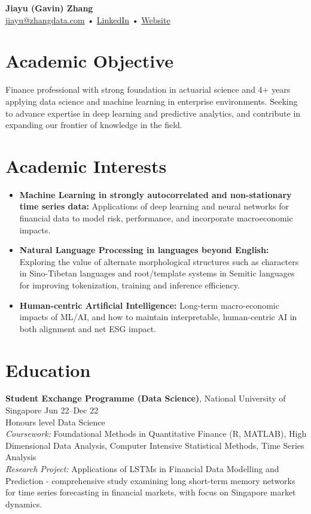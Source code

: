 \documentclass[10pt,letterpaper]{article}
\makeatletter
\newcommand{\name}{Jiayu (Gavin) Zhang}
\newcommand{\emailaddr}{jiayu@zhangdata.com}
\newcommand{\linkedin}{https://www.linkedin.com/in/jiayu-g-zhang}
\newcommand{\website}{https://www.zhangdata.com}
\makeatother
\begin{document}
\begin{center}
  {\LARGE\bfseries \name}\\[2pt]
  \href{mailto:\emailaddr}{\emailaddr} • \href{\linkedin}{LinkedIn} • \href{\website}{Website}
\end{center}

\section*{Academic Objective}
Finance professional with strong foundation in actuarial science and 4+ years applying data science and machine learning in enterprise environments. Seeking to advance expertise in deep learning and predictive analytics, and contribute in expanding our frontier of knowledge in the field.

\section*{Academic Interests}
\begin{itemize}
  \item \textbf{Machine Learning in strongly autocorrelated and non-stationary time series data:} Applications of deep learning and neural networks for financial data to model risk, performance, and incorporate macroeconomic impacts.
  \item \textbf{Natural Language Processing in languages beyond English:} Exploring the value of alternate morphological structures such as characters in Sino-Tibetan languages and root/template systems in Semitic languages for improving tokenization, training and inference efficiency.
  \item \textbf{Human-centric Artificial Intelligence:} Long-term macro-economic impacts of ML/AI, and how to maintain interpretable, human-centric AI in both alignment and net ESG impact.
\end{itemize}

\section*{Education}

\textbf{Student Exchange Programme (Data Science)}, National University of Singapore \hfill Jun 22--Dec 22\\
Honours level Data Science\\
\emph{Coursework:} Foundational Methods in Quantitative Finance (R, MATLAB), High Dimensional Data Analysis, Computer Intensive Statistical Methods, Time Series Analysis\\
\emph{Research Project:} Applications of LSTMs in Financial Data Modelling and Prediction - comprehensive study examining long short-term memory networks for time series forecasting in financial markets, with focus on Singapore market dynamics.
\end{document}
